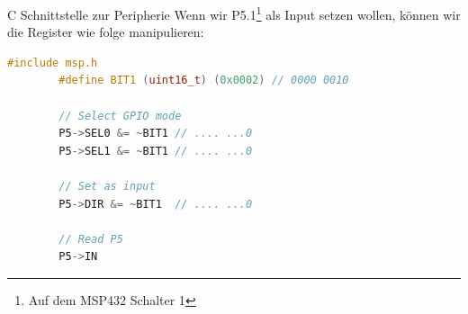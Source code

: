 \begin{example}{C Schnittstelle zur Peripherie}
    Wenn wir P5.1\footnote{Auf dem MSP432 Schalter 1} als Input setzen wollen, können wir die Register wie folge manipulieren:

    \begin{lstlisting}[language=c]
        #include msp.h
        #define BIT1 (uint16_t) (0x0002) // 0000 0010

        // Select GPIO mode
        P5->SEL0 &= ~BIT1 // .... ...0
        P5->SEL1 &= ~BIT1 // .... ...0

        // Set as input
        P5->DIR &= ~BIT1  // .... ...0

        // Read P5
        P5->IN
    \end{lstlisting}
\end{example}